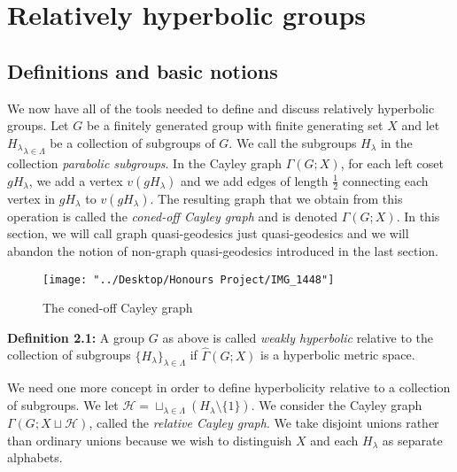 \documentclass[12pt]{article}
\newcommand{\vs}{\vskip10pt}
\begin{document}
	\newpage
	\section{Relatively hyperbolic groups}
	\subsection{Definitions and basic notions}
	
	We now have all of the tools needed to define and discuss relatively hyperbolic groups. Let $G$ be a finitely generated group with finite generating set $X$ and let ${H_{\lambda}}_{\lambda \in \Lambda}$ be a collection of subgroups of $G$. We call the subgroups $H_{\lambda}$ in the collection \textit{parabolic subgroups}. In the Cayley graph $\Gamma(G;X)$, for each left coset $gH_{\lambda}$, we add a vertex $v(gH_{\lambda})$ and we add edges of length $\frac{1}{2}$ connecting each vertex in $gH_{\lambda}$ to $v(gH_{\lambda})$. The resulting graph that we obtain from this operation is called the \textit{coned-off Cayley graph} and is denoted $\hat{\Gamma}(G;X)$. In this section, we will call graph quasi-geodesics just quasi-geodesics and we will abandon the notion of non-graph quasi-geodesics introduced in the last section. 
	
	\vs 
\begin{figure} [H]
	\centering
	\texttt{[image: "../Desktop/Honours Project/IMG\_1448"]}
	\caption{The coned-off Cayley graph}
	\label{fig:img1448}
\end{figure}
	
	\textbf{Definition 2.1: } A group $G$ as above is called \textit{weakly hyperbolic} relative to the collection of subgroups $\{H_{\lambda}\}_{\lambda \in \Lambda}$ if $\hat{\Gamma}(G;X)$ is a hyperbolic metric space. 
	
	\vs 
	
	We need one more concept in order to define hyperbolicity relative to a collection of subgroups. We let $\mathcal{H} = \sqcup_{\lambda \in \Lambda} (H_{\lambda} \setminus \{1\})$. We consider the Cayley graph $\Gamma(G; X \sqcup \mathcal{H})$, called the \textit{relative Cayley graph}. We take disjoint unions rather than ordinary unions because we wish to distinguish $X$ and each $H_{\lambda}$ as separate alphabets.
	
	\vs 
	
\end{document}
